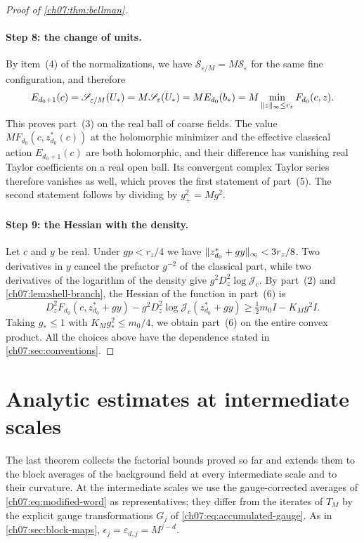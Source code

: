 \begin{proof}[Proof of \cref{ch07:thm:bellman}]
\paragraph{Step 8: the change of units.}
By item~(4) of the normalizations, we have $\mathscr S_{\varepsilon/M}=M\mathscr S_\varepsilon$ for the same fine configuration, and therefore
\[
 E_{d_0+1}(c)=\mathscr S_{\varepsilon/M}(U_*)=M\mathscr S_\varepsilon(U_*)=ME_{d_0}(b_*)=M\min_{\lVert z\rVert_\infty\le r_z}F_{d_0}(c,z).
\]
This proves part~(3) on the real ball of coarse fields. The value $MF_{d_0}(c,z_{d_0}^*(c))$ at the holomorphic minimizer and the effective classical action $E_{d_0+1}(c)$ are both holomorphic, and their difference has vanishing real Taylor coefficients on a real open ball. Its convergent complex Taylor series therefore vanishes as well, which proves the first statement of part~(5). The second statement follows by dividing by $g_+^2=Mg^2$.

\paragraph{Step 9: the Hessian with the density.}
Let $c$ and $y$ be real. Under $gp<r_z/4$ we have $\lVert z_{d_0}^*+gy\rVert_\infty<3r_z/8$. Two derivatives in $y$ cancel the prefactor $g^{-2}$ of the classical part, while two derivatives of the logarithm of the density give $g^2D_z^2\log\mathcal J_c$. By part~(2) and \cref{ch07:lem:shell-branch}, the Hessian of the function in part~(6) is
\[
 D_z^2F_{d_0}(c,z_{d_0}^*+gy)-g^2D_z^2\log\mathcal J_c(z_{d_0}^*+gy)\ge\tfrac12m_0I-K_Mg^2I .
\]
Taking $g_*\le1$ with $K_Mg_*^2\le m_0/4$, we obtain part~(6) on the entire convex product. All the choices above have the dependence stated in \cref{ch07:sec:conventions}.
\end{proof}

\section{Analytic estimates at intermediate scales}\label{ch07:sec:intermediate}

The last theorem collects the factorial bounds proved so far and extends them to the block averages of the background field at every intermediate scale and to their curvature. At the intermediate scales we use the gauge-corrected averages of \eqref{ch07:eq:modified-word} as representatives; they differ from the iterates of $T_M$ by the explicit gauge transformations $G_j$ of \eqref{ch07:eq:accumulated-gauge}. As in \cref{ch07:sec:block-maps}, $\epsilon_j=\varepsilon_{d,j}=M^{j-d}$.

